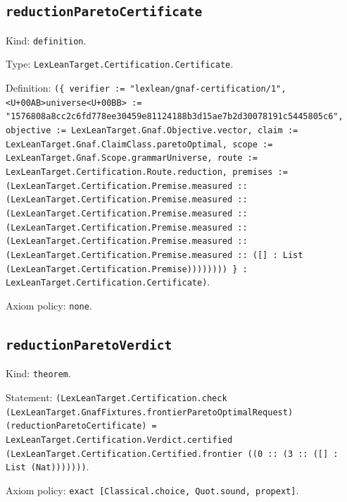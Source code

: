 \documentclass[11pt]{article}
\begin{document}
\subsection*{\texttt{reductionParetoCertificate}}
\noindent Kind: \texttt{definition}.\par
\noindent Type: \texttt{LexLeanTarget.Certification.Certificate}.\par
\noindent Definition: \texttt{(\{ verifier := "lexlean/gnaf-certification/1", <U+00AB>universe<U+00BB> := "1576808a8cc2c6fd778ee30459e81124188b3d15ae7b2d30078191c5445805c6", objective := LexLeanTarget.Gnaf.Objective.vector, claim := LexLeanTarget.Gnaf.ClaimClass.paretoOptimal, scope := LexLeanTarget.Gnaf.Scope.grammarUniverse, route := LexLeanTarget.Certification.Route.reduction, premises := (LexLeanTarget.Certification.Premise.measured :: (LexLeanTarget.Certification.Premise.measured :: (LexLeanTarget.Certification.Premise.measured :: (LexLeanTarget.Certification.Premise.measured :: (LexLeanTarget.Certification.Premise.measured :: (LexLeanTarget.Certification.Premise.measured :: ([] : List (LexLeanTarget.Certification.Premise)))))))) \} : LexLeanTarget.Certification.Certificate)}.\par
\noindent Axiom policy: \texttt{none}.\par
\subsection*{\texttt{reductionParetoVerdict}}
\noindent Kind: \texttt{theorem}.\par
\noindent Statement: \texttt{(LexLeanTarget.Certification.check (LexLeanTarget.GnafFixtures.frontierParetoOptimalRequest) (reductionParetoCertificate) = LexLeanTarget.Certification.Verdict.certified (LexLeanTarget.Certification.Certified.frontier ((0 :: (3 :: ([] : List (Nat)))))))}.\par
\noindent Axiom policy: \texttt{exact [Classical.choice, Quot.sound, propext]}.\par
\end{document}
